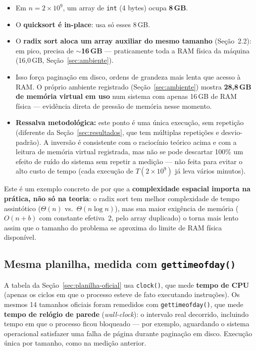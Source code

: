 \documentclass[11pt,a4paper]{article}
\renewcommand{\_}{\underscoreoriginal\allowbreak}
\begin{document}
\begin{itemize}
  \item Em $n=2\times10^9$, um array de \texttt{int} (4 bytes) ocupa
    \textbf{8\,GB}.
  \item O \textbf{quicksort é in-place}: usa só esses 8\,GB.
  \item O \textbf{radix sort aloca um array auxiliar do mesmo tamanho}
    (Seção~2.2): em pico, precisa de $\sim$\textbf{16\,GB} ---
    praticamente toda a RAM física da máquina (16,0\,GB,
    Seção~\ref{sec:ambiente}).
  \item Isso força paginação em disco, ordens de grandeza mais lenta
    que acesso à RAM. O próprio ambiente registrado
    (Seção~\ref{sec:ambiente}) mostra \textbf{28,8\,GB de memória
    virtual em uso} num sistema com apenas 16\,GB de RAM física ---
    evidência direta de pressão de memória nesse momento.
  \item \textbf{Ressalva metodológica:} este ponto é uma única execução,
    sem repetição (diferente da Seção~\ref{sec:resultados}, que tem
    múltiplas repetições e desvio-padrão). A inversão é consistente com
    o raciocínio teórico acima e com a leitura de memória virtual
    registrada, mas não se pode descartar 100\% um efeito de ruído do
    sistema sem repetir a medição --- não feita para evitar o alto
    custo de tempo (cada execução de $T(2\times10^9)$ já leva vários
    minutos).
\end{itemize}

Este é um exemplo concreto de por que a \textbf{complexidade espacial
importa na prática, não só na teoria}: o radix sort tem melhor
complexidade de tempo assintótico ($\Theta(n)$ vs.\ $\Theta(n\log n)$),
mas sua maior exigência de memória ($O(n+b)$ com constante efetiva~2,
pelo array duplicado) o torna mais lento assim que o tamanho do
problema se aproxima do limite de RAM física disponível.

\subsection{Mesma planilha, medida com \texttt{gettimeofday()}}
\label{sec:gettimeofday}

A tabela da Seção~\ref{sec:planilha-oficial} usa \texttt{clock()},
que mede \textbf{tempo de CPU} (apenas os ciclos em que o processo
esteve de fato executando instruções). Os mesmos 14 tamanhos oficiais
foram remedidos com \texttt{gettimeofday()}, que mede \textbf{tempo de
relógio de parede} (\emph{wall-clock}): o intervalo real decorrido,
incluindo tempo em que o processo ficou bloqueado --- por exemplo,
aguardando o sistema operacional satisfazer uma falha de página durante
paginação em disco. Execução única por tamanho, como na medição
anterior.
\end{document}
